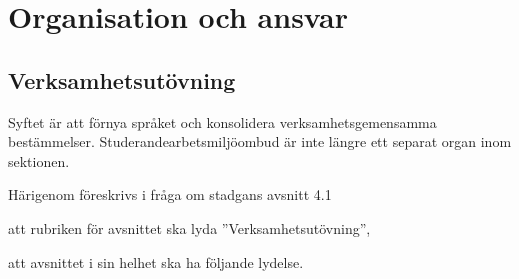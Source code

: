 \documentclass{article}
\begin{document}
\section{Organisation och ansvar}
\subsection{Verksamhetsutövning}
Syftet är att förnya språket och konsolidera verksamhetsgemensamma bestämmelser.
Studerandearbetsmiljöombud är inte längre ett separat organ inom sektionen.

Härigenom föreskrivs i fråga om stadgans avsnitt 4.1
\begin{dels}
    \item att rubriken för avsnittet ska lyda ''Verksamhetsutövning'',
    \item att avsnittet i sin helhet ska ha följande lydelse.
\end{dels}
\end{document}
